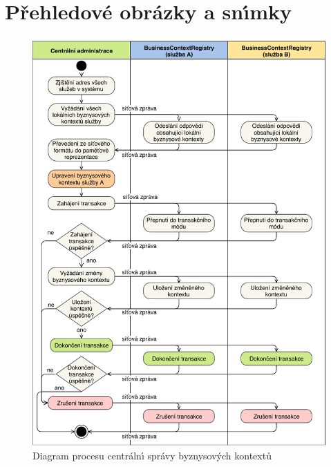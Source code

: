 
\chapter{Přehledové obrázky a sn\'{\i}mky}

\begin{figure}
    \centering
    \includegraphics[keepaspectratio=true, width=\linewidth]{figures/business-context-management.pdf}
    \caption{Diagram procesu centráln\'{\i} správy byznysov\'ych kontextů}
    \label{fig:business-context-management}
\end{figure}

